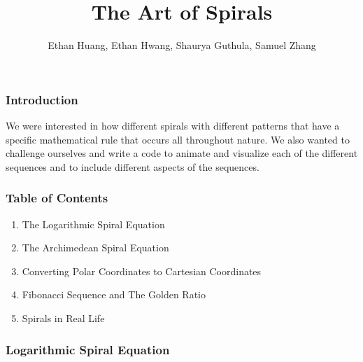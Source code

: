 \documentclass{beamer}
\title{The Art of Spirals}
\author{Ethan Huang, Ethan Hwang, Shaurya Guthula, Samuel Zhang}
\begin{document}
\frame{\titlepage}

\begin{frame}
\frametitle{Introduction}
We were interested in how different spirals with different patterns that 
 have a specific mathematical rule that occurs all throughout nature. 
 We also wanted to challenge ourselves and write a code to animate and visualize
  each of the different sequences and to include different aspects of the sequences.

\end{frame}

\begin{frame}
\frametitle{Table of Contents}

\begin{enumerate}
    \item {\LARGE The Logarithmic Spiral Equation}
    \item {\LARGE The Archimedean Spiral Equation}
    \item {\LARGE Converting Polar Coordinates to Cartesian Coordinates}
    \item {\LARGE Fibonacci Sequence and The Golden Ratio}
    \item {\LARGE Spirals in Real Life}
\end{enumerate}

\end{frame}

\begin{frame}[plain]
\frametitle{Logarithmic Spiral Equation}


\end{frame}
\end{document}
